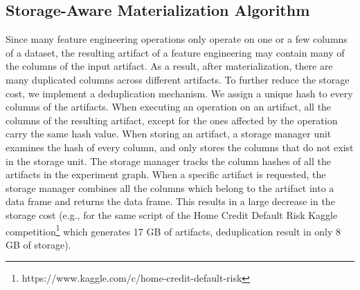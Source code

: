 \subsection{Storage-Aware Materialization Algorithm}
Since many feature engineering operations only operate on one or a few columns of a dataset, the resulting artifact of a feature engineering may contain many of the columns of the input artifact.
As a result, after materialization, there are many duplicated columns across different artifacts.
To further reduce the storage cost, we implement a deduplication mechanism.
We assign a unique hash to every columns of the artifacts.
When executing an operation on an artifact, all the columns of the resulting artifact, except for the ones affected by the operation carry the same hash value.
When storing an artifact, a storage manager unit examines the hash of every column, and only stores the columns that do not exist in the storage unit.
The storage manager tracks the column hashes of all the artifacts in the experiment graph.
When a specific artifact is requested, the storage manager combines all the columns which belong to the artifact into a data frame and returns the data frame.
This results in a large decrease in the storage cost (e.g., for the same script of the Home Credit Default Risk Kaggle competition\footnote{https://www.kaggle.com/c/home-credit-default-risk} which generates 17 GB of artifacts, deduplication result in only 8 GB of storage).

